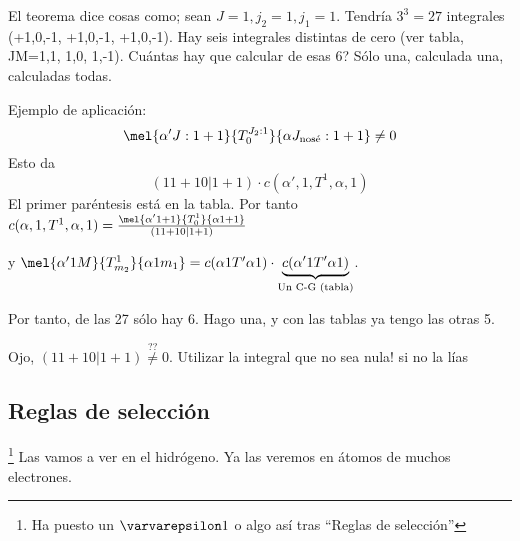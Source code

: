 El teorema dice cosas como;
sean $J=1,j_2=1,j_1=1$. Tendría $3^3=27$ integrales (+1,0,-1,
+1,0,-1,   +1,0,-1). Hay seis integrales distintas de cero (ver tabla,
JM=1,1, 1,0,  1,-1). Cuántas hay que calcular de esas 6? Sólo una,
calculada una, calculadas todas.

Ejemplo de aplicación:
\begin{equation}
  \mel{\alpha' J:1 +1}{T_0^{J_2:1}}{\alpha J_{\text{nosé}}:1 +1} \neq 0
\end{equation}
Esto da
\begin{equation}
  (1 1 +1 0 | 1 +1) \cdot c (\alpha', 1 , T^1, \alpha, 1)
\end{equation}
El primer paréntesis está en la tabla. Por tanto
$c(\alpha, 1, T^1,\alpha,1) = \frac{\mel{\alpha' 1 +1 }{T_0^1}{\alpha 1 +1}}{(1 1 +1 0 | 1
  +1)}$

y $\mel{\alpha' 1 M }{T_{m_2}^1}{\alpha 1 m_1} = c (\alpha 1 T' \alpha 1) \cdot
\underbrace{c(\alpha' 1 T' \alpha 1)}_{\text{Un C-G (tabla)}}$.

Por tanto, de las 27 sólo hay 6. Hago una, y con las tablas ya tengo
las otras 5.

Ojo, $(1 1 +1 0 | 1 +1) \stackrel{??}{\neq}0$. Utilizar la integral
que no sea nula! si no la lías

\subsection{Reglas de selección}\footnote{Ha puesto un $\varvarepsilon1$ o algo
  así tras ``Reglas de selección''}
Las vamos a ver en el hidrógeno. Ya las veremos en átomos de muchos electrones.

